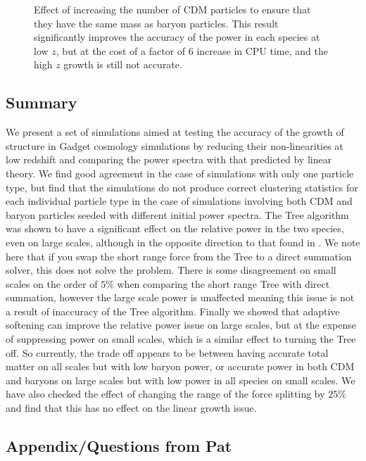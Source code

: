 \documentclass[]{article}
\begin{document}
\begin{figure}[h]
	\caption{Effect of increasing the number of CDM particles to ensure that they have the same mass as baryon particles. This result significantly improves the accuracy of the power in each species at low $z$, but at the cost of a factor of 6 increase in CPU time, and the high $z$ growth is still not accurate.}
\end{figure}

\clearpage
\subsection{Summary}
We present a set of simulations aimed at testing the accuracy of the growth of structure in Gadget cosmology simulations by reducing their non-linearities at low redshift and comparing the power spectra with that predicted by linear theory. We find good agreement in the case of simulations with only one particle type, but find that the simulations do not produce correct clustering statistics for each individual particle type in the case of simulations involving both CDM and baryon particles seeded with different initial power spectra. The Tree algorithm was shown to have a significant effect on the relative power in the two species, even on large scales, although in the opposite direction to that found in \cite{Angulo2013}. We note here that if you swap the short range force from the Tree to a direct summation solver, this does not solve the problem. There is some disagreement on small scales on the order of $5\%$ when comparing the short range Tree with direct summation, however the large scale power is unaffected meaning this issue is not a result of inaccuracy of the Tree algorithm. Finally we showed that adaptive softening can improve the relative power issue on large scales, but at the expense of suppressing power on small scales, which is a similar effect to turning the Tree off. So currently, the trade off appears to be between having accurate total matter on all scales but with low baryon power, or accurate power in both CDM and baryons on large scales but with low power in all species on small scales. We have also checked the effect of changing the range of the force splitting by $25\%$ and find that this has no effect on the linear growth issue.

\subsection{Appendix/Questions from Pat}



\end{document}
